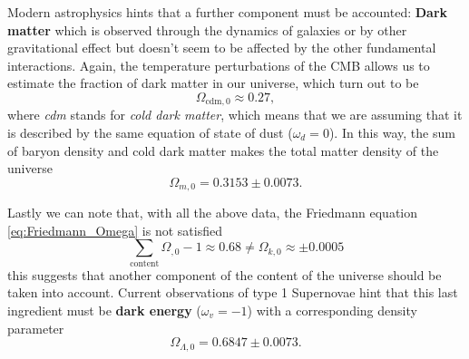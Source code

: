 Modern astrophysics hints that a further component must be accounted: \textbf{Dark matter} which is observed through the dynamics of galaxies or by other gravitational effect but doesn't seem to be affected by the other fundamental interactions. Again, the temperature perturbations of the CMB allows us to estimate the fraction of dark matter in our universe, which turn out to be $$\Omega_{\text{cdm},0} \approx0.27,$$ where \emph{cdm} stands for \emph{cold dark matter}, which means that we are assuming that it is described by the same equation of state of dust ($\omega_d=0$). In this way, the sum of baryon density and cold dark matter makes the total matter density of the universe
$$\Omega_{m,0}=0.3153\pm0.0073.$$

Lastly we can note that, with all the above data, the Friedmann equation \eqref{eq:Friedmann_Omega} is not satisfied $$\sum_{\text{content}}\Omega_{,0}-1\approx0.68\neq\Omega_{k,0}\approx\pm0.0005 $$this suggests that another component of the content of the universe should be taken into account. Current observations of type 1 Supernovae hint that this last ingredient must be \textbf{dark energy} ($\omega_v=-1$) with a corresponding density parameter 
$$\Omega_{\Lambda,0}=0.6847\pm0.0073.$$

